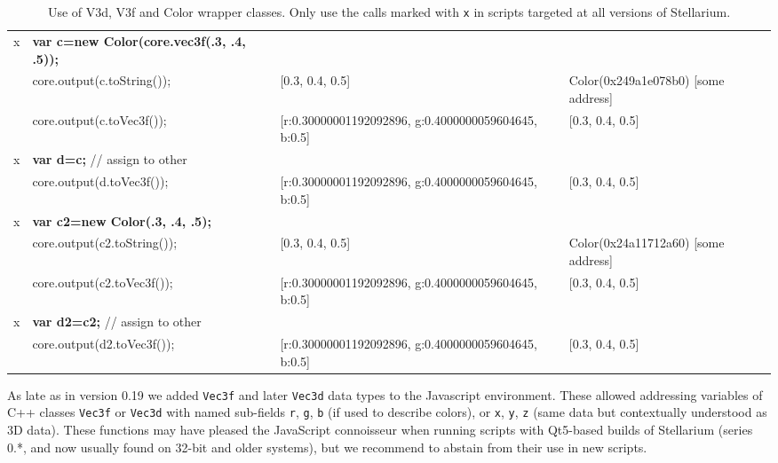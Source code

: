 \begin{sidewaystable}
{\begin{tabular}{rlll}
x&\textbf{var c=new Color(core.vec3f(.3, .4, .5));}      &                                                              &                                          \\
 &core.output(c.toString());                    &  [0.3, 0.4, 0.5]                                                      &  Color(0x249a1e078b0) [some address]     \\
 &core.output(c.toVec3f());                     &  [r:0.30000001192092896, g:0.4000000059604645, b:0.5]                 &  [0.3, 0.4, 0.5]                         \\
x&\textbf{var d=c;} // assign to other          &                                                                       &                                          \\
 &core.output(d.toVec3f());                     &  [r:0.30000001192092896, g:0.4000000059604645, b:0.5]                 &  [0.3, 0.4, 0.5]                         \\\hline
x&\textbf{var c2=new Color(.3, .4, .5);}        &                                                                       &                                          \\
 &core.output(c2.toString());                   &  [0.3, 0.4, 0.5]                                                      &  Color(0x24a11712a60) [some address]     \\
 &core.output(c2.toVec3f());                    &  [r:0.30000001192092896, g:0.4000000059604645, b:0.5]                 &  [0.3, 0.4, 0.5]                         \\
x&\textbf{var d2=c2;} // assign to other        &                                                                       &                                          \\
 &core.output(d2.toVec3f());                    &  [r:0.30000001192092896, g:0.4000000059604645, b:0.5]                 &  [0.3, 0.4, 0.5]                                            
\end{tabular}}
\caption{Use of V3d, V3f and Color wrapper classes. Only use the calls marked with \texttt{x} in scripts targeted at all versions of Stellarium.}
\label{tab:scripting:Vec3f}
\end{sidewaystable}



As late as in version 0.19 we added \texttt{Vec3f} and later \texttt{Vec3d} data types to the Javascript environment. 
These allowed addressing variables of C++ classes \texttt{Vec3f} or \texttt{Vec3d} with named sub-fields \texttt{r}, \texttt{g}, \texttt{b} 
(if used to describe colors), or \texttt{x}, \texttt{y}, \texttt{z} (same data but contextually understood as 3D data).
These functions may have pleased the JavaScript connoisseur when running scripts with Qt5-based builds of 
Stellarium (series 0.*, and now usually found on 32-bit and older systems), but we recommend to abstain from their use in new scripts.

